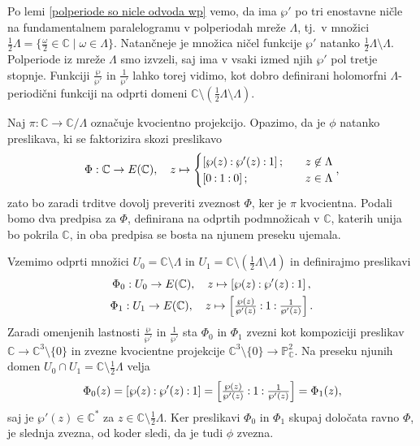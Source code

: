 \documentclass[mat1]{fmfdelo}
\numberwithin{equation}{section}
\newcommand{\C}{\mathbb C}
\newcommand{\CM}{\mathbb C ^*}
\newcommand{\PC}{\mathbb{P}^2_\C}
\newcommand{\oio}{\pcoor{0: 1 : 0}}
\newcommand{\om}{\omega}
\newcommand{\torus}{\C/\Lambda}
\newcommand{\pcoor}[1]{%
\begingroup\lccode`~=`: \lowercase{\endgroup
\edef~}{\mathbin{\mathchar\the\mathcode`:}\nobreak}%
\left[%
\begingroup
\mathcode`:=\string"8000
#1%
\endgroup
\right]%
}
\newcommand{\tj}{tj.\ }
\theoremstyle{definition}
\begin{document}
\begin{dokaz}
    Po lemi \ref{polperiode so nicle odvoda wp} vemo, da ima $\wp'$ po tri enostavne ničle na fundamentalnem paralelogramu v polperiodah mreže $\Lambda$, \tj v množici $\frac{1}{2}\Lambda = \{\frac{\om}{2} \in \C \mid \om \in \Lambda\}$. 
    Natančneje je množica ničel funkcije $\wp'$ natanko $\frac12\Lambda \setminus \Lambda$. Polperiode iz mreže $\Lambda$ smo izvzeli, saj ima v vsaki izmed njih $\wp'$ pol tretje stopnje. 
    Funkciji $\frac{\wp}{\wp'}$ in $\frac{1}{\wp'}$ lahko torej vidimo, kot dobro definirani holomorfni $\Lambda$-periodični funkciji na odprti domeni $\C \setminus (\frac12\Lambda \setminus \Lambda)$. 

    
    Naj $\pi : \C \to \torus$ označuje kvocientno projekcijo. Opazimo, da je $\phi$ natanko preslikava, ki se faktorizira skozi preslikavo
    \[
        \Phi: \C \to E(\C), \quad z \mapsto
        \begin{cases}
            \pcoor{\wp(z) : \wp'(z) : 1}; \quad &z \not\in \Lambda \\
            \oio; \quad &z \in \Lambda
        \end{cases}, 
    \]
    zato bo zaradi trditve \cite[trditev 3.22]{MrcunTop} dovolj preveriti zveznost $\Phi$, ker je $\pi$ kvocientna. Podali bomo dva predpisa za $\Phi$, definirana na odprtih podmnožicah v $\C$, katerih unija bo pokrila $\C$, in oba predpisa se bosta na njunem preseku ujemala. 
    
    Vzemimo odprti množici $U_0 = \C \setminus \Lambda$ in $U_1 = \C \setminus (\frac12\Lambda \setminus \Lambda)$ in definirajmo preslikavi
    \begin{gather*}
        \Phi_0 : U_0 \to E(\C), \quad z \mapsto \pcoor{\wp(z) : \wp'(z) : 1}, \\
        \Phi_1 : U_1 \to E(\C), \quad z \mapsto \pcoor{\tfrac{\wp(z)}{\wp'(z)} : 1 : \tfrac{1}{\wp'(z)}}.
    \end{gather*}
    Zaradi omenjenih lastnosti $\tfrac{\wp}{\wp'}$ in $\tfrac{1}{\wp'}$ sta $\Phi_0$ in $\Phi_1$ zvezni kot kompoziciji preslikav $\C \to \C^3\setminus\{0\}$ in zvezne kvocientne projekcije $\C^3\setminus\{0\} \to \PC$. Na preseku njunih domen $U_0 \cap U_1 = \C \setminus \frac12\Lambda$ velja
    \[
        \Phi_0(z) = \pcoor{\wp(z) : \wp'(z) : 1} = 
        \pcoor{\tfrac{\wp(z)}{\wp'(z)} : 1 : \tfrac{1}{\wp'(z)}} = \Phi_1(z),
    \]
    saj je $\wp'(z) \in \CM$ za $z \in \C \setminus \frac12\Lambda$. Ker preslikavi $\Phi_0$ in $\Phi_1$ skupaj določata ravno $\Phi$, je slednja zvezna, od koder sledi, da je tudi $\phi$ zvezna.  
     

\end{dokaz}
\end{document}
